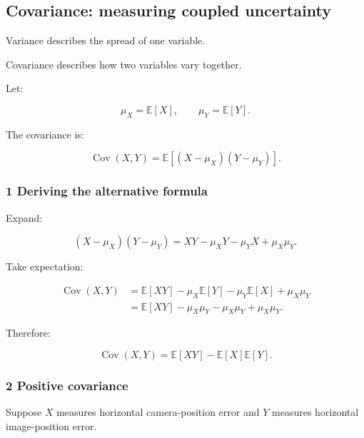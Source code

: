 \subsection{Covariance: measuring coupled uncertainty}\label{02-foundations-ii-ch023-covariance-measuring-coupled-uncertainty}

\hypertarget{02-foundations-ii-ch023-covariance-measuring-coupled-uncertainty}{}

Variance describes the spread of one variable.

Covariance describes how two variables vary together.

Let:

\[
 \mu_X=\mathbb E[X], \qquad \mu_Y=\mathbb E[Y].
\]

The covariance is:

\[
 \boxed{ \operatorname{Cov}(X,Y)= \mathbb E[(X-\mu_X)(Y-\mu_Y)] }.
\]

\subsubsection{1 Deriving the alternative formula}\label{02-foundations-ii-ch023-deriving-the-alternative-formula}

\hypertarget{02-foundations-ii-ch023-deriving-the-alternative-formula}{}

Expand:

\[
 (X-\mu_X)(Y-\mu_Y) = XY-\mu_XY-\mu_YX+\mu_X\mu_Y.
\]

Take expectation:

\[
 \begin{aligned} \operatorname{Cov}(X,Y) &=\mathbb E[XY] -\mu_X\mathbb E[Y] -\mu_Y\mathbb E[X] +\mu_X\mu_Y\\ &=\mathbb E[XY] -\mu_X\mu_Y-\mu_X\mu_Y+\mu_X\mu_Y. \end{aligned}
\]

Therefore:

\[
 \boxed{ \operatorname{Cov}(X,Y) = \mathbb E[XY]-\mathbb E[X]\mathbb E[Y] }.
\]

\subsubsection{2 Positive covariance}\label{02-foundations-ii-ch023-positive-covariance}

\hypertarget{02-foundations-ii-ch023-positive-covariance}{}

Suppose \(X\) measures horizontal camera-position error and \(Y\) measures horizontal image-position error.

